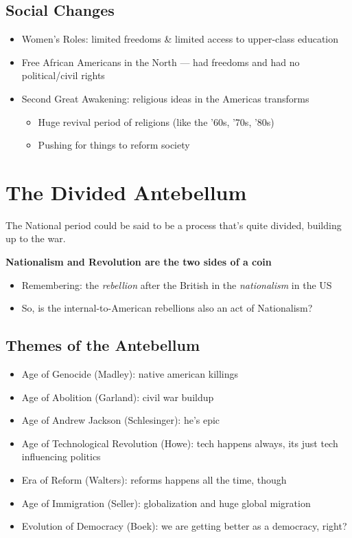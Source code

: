 \documentclass[11pt]{article}
\begin{document}
\subsection{Social Changes}
\label{sec:orgf8aee37}
\begin{itemize}
\item Women's Roles: limited freedoms \& limited access to upper-class education
\item Free African Americans in the North --- had freedoms and had no political/civil rights
\item Second Great Awakening: religious ideas in the Americas transforms
\begin{itemize}
\item Huge revival period of religions (like the '60s, '70s, '80s)
\item Pushing for things to reform society
\end{itemize}
\end{itemize}

\section{The Divided Antebellum}
\label{sec:org9fec7f4}
The National period could be said to be a process that's quite divided, building up to the war.

\textbf{\textbf{Nationalism and Revolution are the two sides of a coin}}

\begin{itemize}
\item Remembering: the \emph{rebellion} after the British in the \emph{nationalism} in the US
\item So, is the internal-to-American rebellions also an act of Nationalism?
\end{itemize}

\subsection{Themes of the Antebellum}
\label{sec:org5cac159}
\begin{itemize}
\item Age of Genocide (Madley): native american killings
\item Age of Abolition (Garland): civil war buildup
\item Age of Andrew Jackson (Schlesinger): he's epic
\item Age of Technological Revolution (Howe): tech happens always, its just tech influencing politics
\item Era of Reform (Walters): reforms happens all the time, though
\item Age of Immigration (Seller): globalization and huge global migration
\item Evolution of Democracy (Boek): we are getting better as a democracy, right?
\end{itemize}
\end{document}
